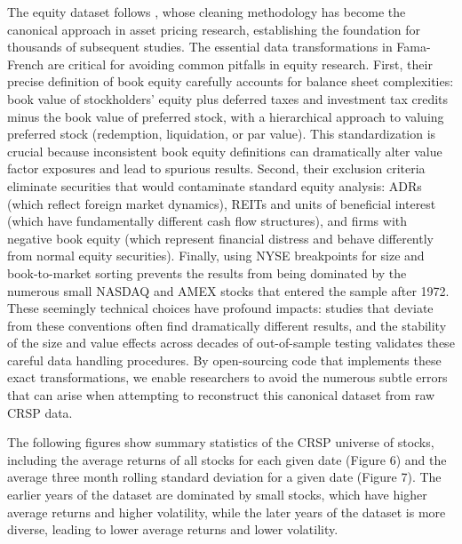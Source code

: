 \documentclass{article}
\begin{document}
\begin{appendices}
The equity dataset follows \cite{Fama1993}, whose cleaning methodology has 
become the canonical approach in asset pricing research, establishing the 
foundation for thousands of subsequent studies. The essential data transformations 
in Fama-French are critical for avoiding common pitfalls in equity research. 
First, their precise definition of book equity carefully accounts for balance 
sheet complexities: book value of stockholders' equity plus deferred taxes and 
investment tax credits minus the book value of preferred stock, with 
a hierarchical approach to valuing preferred stock (redemption, liquidation, or 
par value). This standardization is crucial because inconsistent book equity 
definitions can dramatically alter value factor exposures and lead to spurious 
results. Second, their exclusion criteria eliminate securities that would 
contaminate standard equity analysis: ADRs (which reflect foreign market dynamics), 
REITs and units of beneficial interest (which have fundamentally different 
cash flow structures), and firms with negative book equity 
(which represent financial distress and behave differently from normal equity 
securities). Finally, using NYSE breakpoints for size and book-to-market 
sorting prevents the results from being dominated by the numerous small 
NASDAQ and AMEX stocks that entered the sample after 1972. These seemingly 
technical choices have profound impacts: studies that deviate from these conventions 
often find dramatically different results, and the stability of the size and value 
effects across decades of out-of-sample testing validates these careful data 
handling procedures. By open-sourcing code that implements these exact 
transformations, we enable researchers to avoid the numerous subtle errors that 
can arise when attempting to reconstruct this canonical dataset from raw CRSP data.

The following figures show summary statistics of the CRSP universe of stocks, 
including the average returns of all stocks for each given date (Figure 6) 
and the average three month rolling standard deviation for a given date (Figure 7).
The earlier years of the dataset are dominated by small stocks, 
which have higher average returns and higher volatility, while the later years of 
the dataset is more diverse, leading to lower average returns and lower volatility.


\end{appendices}
\end{document}
